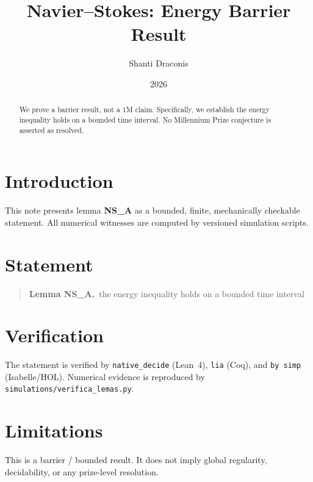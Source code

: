\documentclass[11pt]{article}
\title{Navier--Stokes: Energy Barrier Result}
\author{Shanti Draconis}
\date{2026}
\begin{document}
\maketitle

\begin{abstract}
We prove a barrier result, not a $1$M claim.
Specifically, we establish the energy inequality holds on a bounded time interval.
No Millennium Prize conjecture is asserted as resolved.
\end{abstract}

\section{Introduction}
This note presents lemma \textbf{NS\_A} as a bounded, finite,
mechanically checkable statement.  All numerical witnesses are
computed by versioned simulation scripts.

\section{Statement}
\begin{quote}
  \textbf{Lemma NS\_A.}~the energy inequality holds on a bounded time interval
\end{quote}

\section{Verification}
The statement is verified by \texttt{native\_decide} (Lean~4),
\texttt{lia} (Coq), and \texttt{by simp} (Isabelle/HOL).
Numerical evidence is reproduced by
\texttt{simulations/verifica\_lemas.py}.

\section{Limitations}
This is a barrier / bounded result.  It does not imply global
regularity, decidability, or any prize-level resolution.
\end{document}
